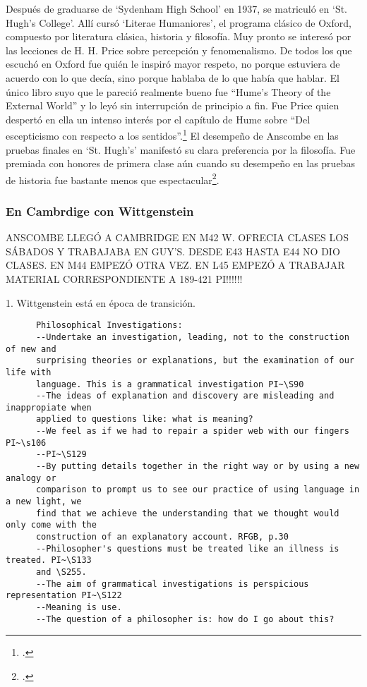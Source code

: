       Después de graduarse de `Sydenham High School' en 1937, se matriculó en `St.
      Hugh's College'. Allí cursó `Literae Humaniores', el programa clásico de Oxford,
      compuesto por literatura clásica, historia y filosofía. Muy pronto se interesó
      por las lecciones de H. H. Price sobre percepción y fenomenalismo. De todos los
      que escuchó en Oxford fue quién le inspiró mayor respeto, no porque estuviera de
      acuerdo con lo que decía, sino porque hablaba de lo que había que hablar. El
      único libro suyo que le pareció realmente bueno fue ``Hume's Theory of the
      External World'' y lo leyó sin interrupción de principio a
      fin. Fue Price quien despertó en ella un intenso interés por el capítulo de Hume
      sobre ``Del escepticismo con respecto a los sentidos''.\footcite[cf.~][p.~viii
      \S1]{M&PotM} El desempeño de Anscombe en las pruebas finales en `St. Hugh's'
      manifestó su clara preferencia por la filosofía. Fue premiada con honores de
      primera clase aún cuando su desempeño en las pruebas de historia fue bastante
      menos que espectacular\footcite[p.~3~\S1]{teichmann}.

      \subsubsection{En Cambrdige con Wittgenstein}
      ANSCOMBE LLEGÓ A CAMBRIDGE EN M42 W. OFRECIA CLASES LOS SÁBADOS Y TRABAJABA EN
      GUY'S. DESDE E43 HASTA E44 NO DIO CLASES. EN M44 EMPEZÓ OTRA VEZ. EN L45 EMPEZÓ
      A TRABAJAR MATERIAL CORRESPONDIENTE A 189-421 PI!!!!!!

      1. Wittgenstein está en época de transición.
      \begin{verbatim}
      Philosophical Investigations:
      --Undertake an investigation, leading, not to the construction of new and
      surprising theories or explanations, but the examination of our life with
      language. This is a grammatical investigation PI~\S90 
      --The ideas of explanation and discovery are misleading and inappropiate when
      applied to questions like: what is meaning?
      --We feel as if we had to repair a spider web with our fingers PI~\s106
      --PI~\S129
      --By putting details together in the right way or by using a new analogy or
      comparison to prompt us to see our practice of using language in a new light, we
      find that we achieve the understanding that we thought would only come with the
      construction of an explanatory account. RFGB, p.30
      --Philosopher's questions must be treated like an illness is treated. PI~\S133
      and \S255.
      --The aim of grammatical investigations is perspicious representation PI~\S122
      --Meaning is use.
      --The question of a philosopher is: how do I go about this?
      \end{verbatim}


